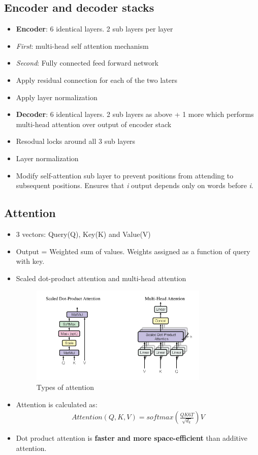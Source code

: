 \documentclass[a4paper]{article}
\begin{document}
\subsection{Encoder and decoder stacks}
\begin{itemize}
    \item \textbf{Encoder}: 6 identical layers. 2 sub layers per layer
    \item \textit{First}: multi-head self attention mechanism
    \item \textit{Second}: Fully connected feed forward network
    \item Apply residual connection for each of the two laters
    \item Apply layer normalization
    \item \textbf{Decoder}: 6 identical layers. 2 sub layers as above + 1 more which performs multi-head attention over output of encoder stack 
    \item Resodual locks around all 3 sub layers
    \item Layer normalization
    \item Modify self-attention sub layer to prevent positions from attending to subsequent positions. Ensures that \textit{i} output depends only on words before \textit{i}.
\end{itemize}
\subsection{Attention}
\begin{itemize}
    \item 3 vectors: Query(Q), Key(K) and Value(V)
    \item Output = Weighted sum of values. Weights assigned as a function of query with key.
    \item Scaled dot-product attention and multi-head attention
    \begin{figure}[H]
        \centering
        \includegraphics[width=0.8\textwidth]{attention_types}
        \caption{Types of attention}
        \label{fig:attention_types}
    \end{figure}
    \item Attention is calculated as:
    \begin{equation}
    \begin{split}
        Attention(Q,K,V) = softmax(\frac{QK6T}{\sqrt{d_k}})V
    \end{split}
    \end{equation}
    \item Dot product attention is \textbf{faster and more space-efficient} than additive attention. 
\end{itemize}
\end{document}
